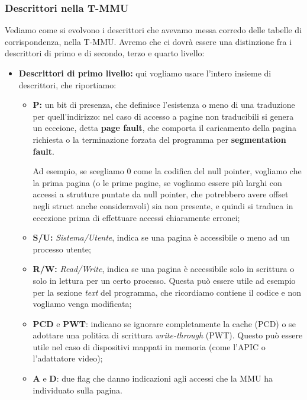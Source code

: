 \documentclass[a4paper,11pt]{article}
\begin{document}
\subsubsection{Descrittori nella T-MMU}
Vediamo come si evolvono i descrittori che avevamo messa corredo delle tabelle di corrispondenza, nella T-MMU.
Avremo che ci dovrà essere una distinzione fra i descrittori di primo e di secondo, terzo e quarto livello:
\begin{itemize}
	\item \textbf{Descrittori di primo livello:}
		qui vogliamo usare l'intero insieme di descrittori, che riportiamo:
\begin{itemize}
	\item \textbf{P:} un bit di presenza, che definisce l'esistenza o meno di una traduzione per quell'indirizzo: nel caso di accesso a pagine non traducibili si genera un ecceione, detta \textbf{page fault}, che comporta il caricamento della pagina richiesta o la terminazione forzata del programma per \textbf{segmentation fault}.

		Ad esempio, se scegliamo 0 come la codifica del null pointer, vogliamo che la prima pagina (o le prime pagine, se vogliamo essere più larghi con accessi a strutture puntate da null pointer, che potrebbero avere offset negli struct anche consideravoli) sia non presente, e quindi si traduca in eccezione prima di effettuare accessi chiaramente erronei;
	\item \textbf{S/U:} \textit{Sistema/Utente}, indica se una pagina è accessibile o meno ad un processo utente;  
	\item \textbf{R/W:} \textit{Read/Write}, indica se una pagina è accessibile solo in scrittura o solo in lettura per un certo processo. 
		Questa può essere utile ad esempio per la sezione \textit{text} del programma, che ricordiamo contiene il codice e non vogliamo venga modificata;
	\item \textbf{PCD} e \textbf{PWT}: indicano se ignorare completamente la cache (PCD) o se adottare una politica di scrittura \textit{write-through} (PWT).
		Questo può essere utile nel caso di dispositivi mappati in memoria (come l'APIC o l'adattatore video);
	\item \textbf{A} e \textbf{D}: due flag che danno indicazioni agli accessi che la MMU ha individuato sulla pagina.


\end{itemize}
\end{itemize}
\end{document}
